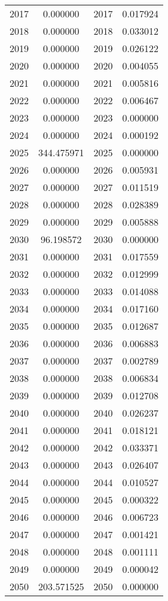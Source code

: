 \documentclass[12pt]{article}
\begin{document}
\begin{longtable}{@{}cccc@{}}
2017 & 0.000000 & 2017 & 0.017924 \\
2018 & 0.000000 & 2018 & 0.033012 \\
2019 & 0.000000 & 2019 & 0.026122 \\
2020 & 0.000000 & 2020 & 0.004055 \\
2021 & 0.000000 & 2021 & 0.005816 \\
2022 & 0.000000 & 2022 & 0.006467 \\
2023 & 0.000000 & 2023 & 0.000000 \\
2024 & 0.000000 & 2024 & 0.000192 \\
2025 & 344.475971 & 2025 & 0.000000 \\
2026 & 0.000000 & 2026 & 0.005931 \\
2027 & 0.000000 & 2027 & 0.011519 \\
2028 & 0.000000 & 2028 & 0.028389 \\
2029 & 0.000000 & 2029 & 0.005888 \\
2030 & 96.198572 & 2030 & 0.000000 \\
2031 & 0.000000 & 2031 & 0.017559 \\
2032 & 0.000000 & 2032 & 0.012999 \\
2033 & 0.000000 & 2033 & 0.014088 \\
2034 & 0.000000 & 2034 & 0.017160 \\
2035 & 0.000000 & 2035 & 0.012687 \\
2036 & 0.000000 & 2036 & 0.006883 \\
2037 & 0.000000 & 2037 & 0.002789 \\
2038 & 0.000000 & 2038 & 0.006834 \\
2039 & 0.000000 & 2039 & 0.012708 \\
2040 & 0.000000 & 2040 & 0.026237 \\
2041 & 0.000000 & 2041 & 0.018121 \\
2042 & 0.000000 & 2042 & 0.033371 \\
2043 & 0.000000 & 2043 & 0.026407 \\
2044 & 0.000000 & 2044 & 0.010527 \\
2045 & 0.000000 & 2045 & 0.000322 \\
2046 & 0.000000 & 2046 & 0.006723 \\
2047 & 0.000000 & 2047 & 0.001421 \\
2048 & 0.000000 & 2048 & 0.001111 \\
2049 & 0.000000 & 2049 & 0.000042 \\
2050 & 203.571525 & 2050 & 0.000000 \\

\end{longtable}
\end{document}
